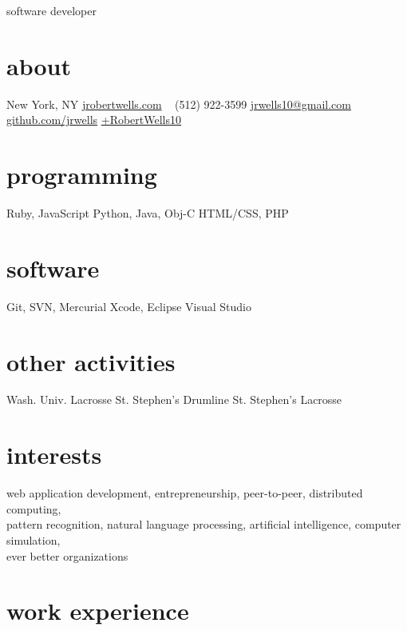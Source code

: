 \documentclass[]{cv}
\begin{document}
       {software developer}

\begin{aside}
  \section{about}
    {New York, NY}
    \href{http://jrobertwells.com}{jrobertwells.com}
    ~
    (512) 922-3599
    \href{mailto:jrwells10@gmail.com}{jrwells10@gmail.com}
    ~
    \href{http://github.com/jrwells}{github.com/jrwells}
    \href{http://google.com/+RobertWells10}{+RobertWells10}
  \section{programming}
    Ruby, JavaScript
    Python, Java, Obj-C
    HTML/CSS, PHP
  \section{software}
    Git, SVN, Mercurial
    Xcode, Eclipse
    Visual Studio
  \section{other activities}
    Wash. Univ. Lacrosse
    St. Stephen's Drumline
    St. Stephen's Lacrosse
\end{aside}

\section{interests}

web application development, entrepreneurship, peer-to-peer, distributed computing, \\
pattern recognition, natural language processing, artificial intelligence, computer simulation, \\
ever better organizations

\section{work experience}
\end{document}
